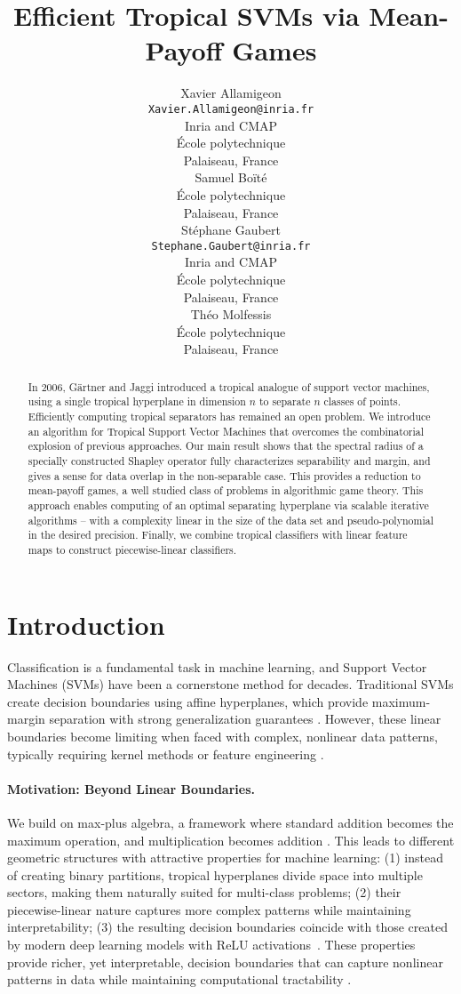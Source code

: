 \documentclass{article}
\title{Efficient Tropical SVMs via Mean-Payoff Games}
\author{
  Xavier Allamigeon \\
  {\small\tt Xavier.Allamigeon@inria.fr}\\
  Inria and CMAP \\
  École polytechnique \\
  Palaiseau, France \\
  \And
  Samuel Boïté \\
  École polytechnique \\
  Palaiseau, France \\
  \And
  Stéphane Gaubert \\
  {\small\tt Stephane.Gaubert@inria.fr}\\
  Inria and CMAP \\
  École polytechnique \\
  Palaiseau, France \\
  \And
  Théo Molfessis \\
  École polytechnique \\
  Palaiseau, France \\
}
\begin{document}
\maketitle
\begin{abstract}
   In 2006, Gärtner and Jaggi introduced a tropical analogue of support vector machines, using a single tropical hyperplane in dimension $n$ to separate $n$ classes of points. Efficiently computing tropical separators has remained an open problem.
   We introduce an algorithm for Tropical Support Vector Machines that overcomes the combinatorial explosion of previous approaches.
   Our main result shows that the spectral radius of a specially constructed Shapley operator fully characterizes separability and margin, and gives a sense for data overlap in the non-separable case.
   This provides a reduction to mean-payoff games, a well studied class of problems in algorithmic game theory.
   This approach enables computing of an optimal separating hyperplane via scalable iterative algorithms -- with a complexity linear in the size of the data set and pseudo-polynomial in the desired precision.
   Finally, we combine tropical classifiers with linear feature maps to construct piecewise-linear classifiers.
\end{abstract}

\section{Introduction}\label{sec:intro}

Classification is a fundamental task in machine learning, and Support Vector Machines (SVMs) have been a cornerstone method for decades. Traditional SVMs create decision boundaries using affine hyperplanes, which provide maximum-margin separation with strong generalization guarantees \cite{vapnik1999}. However, these linear boundaries become limiting when faced with complex, nonlinear data patterns, typically requiring kernel methods or feature engineering \cite{scholkopf2002}.

\paragraph{Motivation: Beyond Linear Boundaries.} We build on max-plus algebra, a framework where standard addition becomes the maximum operation, and multiplication becomes addition \cite{maclagan2015}. This leads to different geometric structures with attractive properties for machine learning: (1) instead of creating binary partitions, tropical hyperplanes divide space into multiple sectors, making them naturally suited for multi-class problems; (2) their piecewise-linear nature captures more complex patterns while maintaining interpretability; (3) the resulting decision boundaries coincide with those created by modern deep learning models with ReLU activations~\cite{zhang2018}. These properties provide richer, yet interpretable, decision boundaries that can capture nonlinear patterns in data while maintaining computational tractability \cite{maragos2021}.
\end{document}
